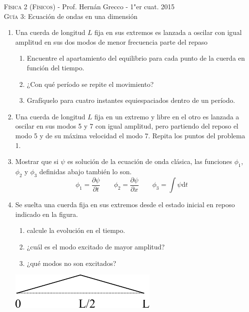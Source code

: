 \documentclass[11pt,spanish,a4paper]{article}
\begin{document}
\begin{center}
    \textsc{\large Física 2 (Físicos)} - Prof. Hernán Grecco - 1"er cuat. 2015\\
	\textsc{\large Guía 3:}	Ecuación de ondas en una dimensión
\end{center}

\begin{enumerate}
\item Una cuerda de longitud \(L\) fija en sus extremos es lanzada a oscilar con igual amplitud en sus dos modos de menor frecuencia parte del repaso
	\begin{enumerate}
		\item Encuentre el apartamiento del equilibrio para cada punto de la cuerda en función del
			tiempo.
		\item ¿Con qué período se repite el movimiento?
		\item Grafíquelo para cuatro instantes equiespaciados dentro de un período.
	\end{enumerate}

\item Una cuerda de longitud \(L\) fija en un extremo y libre en el otro es lanzada a oscilar en sus modos 5 y 7 con igual amplitud, pero partiendo del reposo el modo 5 y de su máxima velocidad el modo 7.
	Repita los puntos del problema 1.

\item Mostrar que si \(\psi\) es solución de la ecuación de onda clásica, las funciones \(\phi_1\), \(\phi_2\) y \(\phi_3\)	definidas abajo también lo son.
	\[
		\phi_1 = \frac{\partial \psi}{\partial t} \qquad \phi_2 = \frac{\partial \psi}{\partial x} \qquad \phi_3 = \int\! \psi \mathrm{d}t
	\]

\item Se suelta una cuerda fija en sus extremos desde el estado inicial en reposo indicado en la figura.
	\begin{enumerate}
		\item calcule la evolución en el tiempo.
		\item ¿cuál es el modo excitado de mayor amplitud?
		\item ¿qué modos no son excitados?
	\end{enumerate}
	\begin{center}
		\includegraphics[width=0.3\linewidth]{g03e04}
	\end{center}


\end{enumerate}
\end{document}

